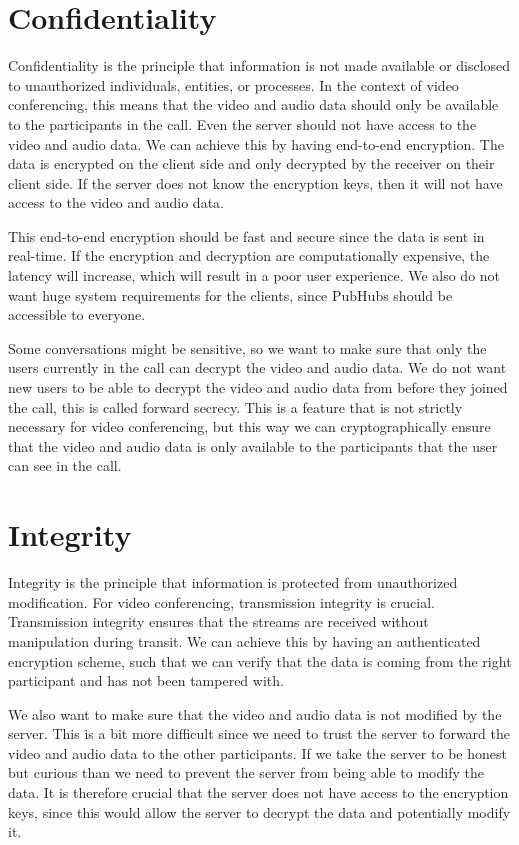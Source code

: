 \documentclass{report}
\begin{document}
\section{Confidentiality}
Confidentiality is the principle that information is not made available or disclosed to unauthorized individuals,
entities, or processes. In the context of video conferencing, this means that the video and audio data should only
be available to the participants in the call. Even the server should not have access to the video and audio data. We
can achieve this by having end-to-end encryption. The data is encrypted on the client side and only decrypted by
the receiver on their client side. If the server does not know the encryption keys, then it will not have access to
the video and audio data.

This end-to-end encryption should be fast and secure since the data is sent in real-time. If the encryption and
decryption are computationally expensive, the latency will increase, which will result in a poor user experience. We
also do not want huge system requirements for the clients, since PubHubs should be accessible to everyone.

Some conversations might be sensitive, so we want to make sure that only the users currently in the call can
decrypt the video and audio data. We do not want new users to be able to decrypt the video and audio data from
before they joined the call, this is called forward secrecy. This is a feature that is not strictly necessary for
video conferencing, but this way we can cryptographically ensure that the video and audio data is only available to
the participants that the user can see in the call.

\section{Integrity}
Integrity is the principle that information is protected from unauthorized modification. For video conferencing, transmission integrity
is crucial. Transmission integrity ensures that the streams are received without manipulation during transit.
We can achieve this by having an authenticated encryption scheme, such that we can verify that the data is coming from
the right participant and has not been tampered with.

We also want to make sure that the video and audio data is not modified by the server. This is a bit more difficult
since we need to trust the server to forward the video and audio data to the other participants. If we take the server
to be honest but curious than we need to prevent the server from being able to modify the data. It is therefore crucial
that the server does not have access to the encryption keys, since this would allow the server to decrypt the data and
potentially modify it.
\end{document}
